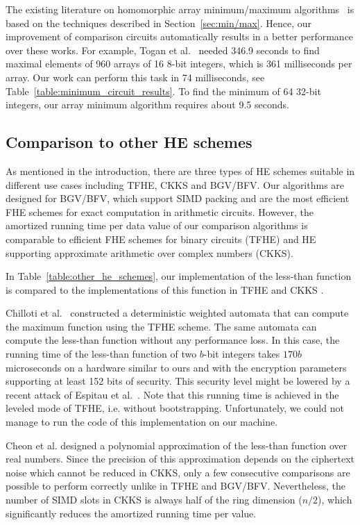 The existing literature on homomorphic array minimum/maximum algorithms~\cite{TMP15,PoPETS:SFR20} is based on the techniques described in Section~\ref{sec:min/max}.
Hence, our improvement of comparison circuits automatically results in a better performance over these works.  
For example, Togan et al.~\cite{TMP15} needed 346.9 seconds to find maximal elements of 960 arrays of 16 8-bit integers, which is 361 milliseconds per array.
Our work can perform this task in 74 milliseconds, see Table~\ref{table:minimum_circuit_results}.
To find the minimum of 64 32-bit integers, our array minimum algorithm requires about 9.5 seconds.

\subsection{Comparison to other HE schemes}
    As mentioned in the introduction, there are three types of HE schemes suitable in different use cases including TFHE, CKKS and BGV/BFV.
    Our algorithms are designed for BGV/BFV, which support SIMD packing and are the most efficient FHE schemes for exact computation in arithmetic circuits.
    However, the amortized running time per data value of our comparison algorithms is comparable to efficient FHE schemes for binary circuits (TFHE) and HE supporting approximate arithmetic over complex numbers (CKKS). 

    In Table~\ref{table:other_he_schemes}, our implementation of the less-than function is compared to the implementations of this function in TFHE \cite{AC:CGGI17,JC:CGGI20} and CKKS \cite{EPRINT:CheKimKim19}.

    Chilloti et al.~\cite{AC:CGGI17,JC:CGGI20} constructed a deterministic weighted automata that can compute the maximum function using the TFHE scheme.
    The same automata can compute the less-than function without any performance loss. 
    In this case, the running time of the less-than function of two $b$-bit integers takes $170 b$ microseconds on a hardware similar to ours and with the encryption parameters supporting at least 152 bits of security.
    This security level might be lowered by a recent attack of Espitau et al.~\cite{EPRINT:EJK20}.
    Note that this running time is achieved in the leveled mode of TFHE, i.e. without bootstrapping.
    Unfortunately, we could not manage to run the code of this implementation on our machine.

    Cheon et al. \cite{EPRINT:CheKimKim19} designed a polynomial approximation of the less-than function over real numbers.
    Since the precision of this approximation depends on the ciphertext noise which cannot be reduced in CKKS, only a few consecutive comparisons are possible to perform correctly unlike in TFHE and BGV/BFV.
    Nevertheless, the number of SIMD slots in CKKS is always half of the ring dimension ($n/2$), which significantly reduces the amortized running time per value.

